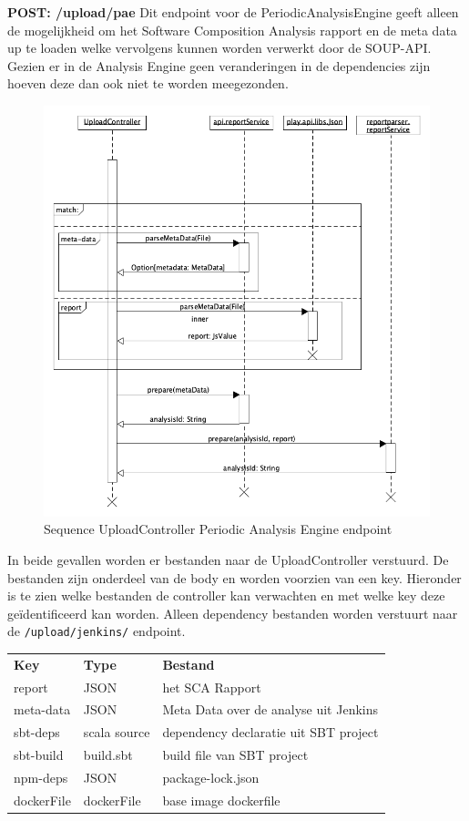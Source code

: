 \textbf{POST: /upload/pae} Dit endpoint voor de PeriodicAnalysisEngine geeft alleen de mogelijkheid om het Software Composition Analysis rapport en de meta data up te loaden welke vervolgens kunnen worden verwerkt door de SOUP-API. Gezien er in de Analysis Engine geen veranderingen in de dependencies zijn hoeven deze dan ook niet te worden meegezonden.

\begin{figure}[bth]
    \myfloatalign
    \includegraphics[width=12cm]{gfx/umlet/exports/SequploadController-pae}
    \caption{Sequence UploadController Periodic Analysis Engine endpoint}
    \label{fig:SequenceUploadReportpaet}
\end{figure}

In beide gevallen worden er bestanden naar de UploadController verstuurd. De bestanden zijn onderdeel van de body en worden voorzien van een key. Hieronder is te zien welke bestanden de controller kan verwachten en met welke key deze geïdentificeerd kan worden. Alleen dependency bestanden worden verstuurt naar de \texttt{/upload/jenkins/} endpoint.

\begin{tabular}{lll}
    \textbf{Key} & \textbf{Type} & \textbf{Bestand} \\
    report & JSON & het SCA Rapport \\
    meta-data & JSON & Meta Data over de analyse uit Jenkins \\
    sbt-deps & scala source & dependency declaratie uit SBT project \\
    sbt-build & build.sbt  & build file van SBT project\\
    npm-deps & JSON & package-lock.json \\
    dockerFile & dockerFile & base image dockerfile
\end{tabular} \\

